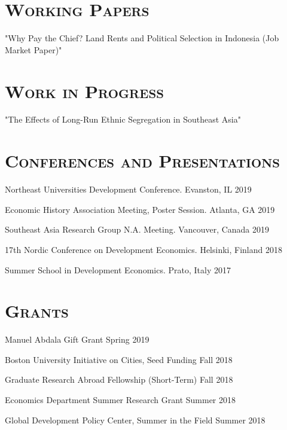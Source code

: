 \documentclass[11pt,overlapped,line,letterpaper]{res}
\newenvironment{list1}{
  \begin{list}{\ding{113}}{%
      \setlength{\itemsep}{0in} \setlength{\itemindent}{-1.6em}
      \setlength{\parsep}{0in} \setlength{\parskip}{0in}
      \setlength{\topsep}{0in} \setlength{\partopsep}{0in}
      \setlength{\leftmargin}{0.5in}}}{\end{list}}
\begin{document}
\begin{resume}
\section{\textbf{\textsc{Working Papers}}}
\begin{list1}
\item[] "Why Pay the Chief? Land Rents and Political Selection in Indonesia (Job Market Paper)"
\end{list1}

\vspace{-4.5pt}
\section{\textbf{\textsc{Work in Progress}}}
\begin{list1}
\item[] "The Effects of Long-Run Ethnic Segregation in Southeast Asia"
\end{list1}

\section{\textbf{\textsc{Conferences and Presentations}}}
\begin{list1}
\item[] Northeast Universities Development Conference. Evanston, IL \hfill{2019}
\item[] Economic History Association Meeting, Poster Session. Atlanta, GA \hfill{2019}
\item[] Southeast Asia Research Group N.A. Meeting. Vancouver, Canada \hfill{2019}
\item[] 17th Nordic Conference on Development Economics. Helsinki, Finland \hfill {2018}
\item[] Summer School in Development Economics. Prato, Italy \hfill {2017}
\end{list1}
\vspace{-4.5pt}

\vspace{-4.5pt}
\section{\textbf{\textsc{Grants}}}
\begin{list1}
\item[] Manuel Abdala Gift Grant \hfill{Spring 2019}
\item[] Boston University Initiative on Cities, Seed Funding \hfill{Fall 2018} 
\item[] Graduate Research Abroad Fellowship (Short-Term) \hfill{Fall 2018} 
\item[] Economics Department Summer Research Grant \hfill{Summer 2018} 
\item[] Global Development Policy Center, Summer in the Field \hfill{Summer 2018} 
\end{list1}
\vspace{-4.5pt}


\end{resume}
\end{document}
